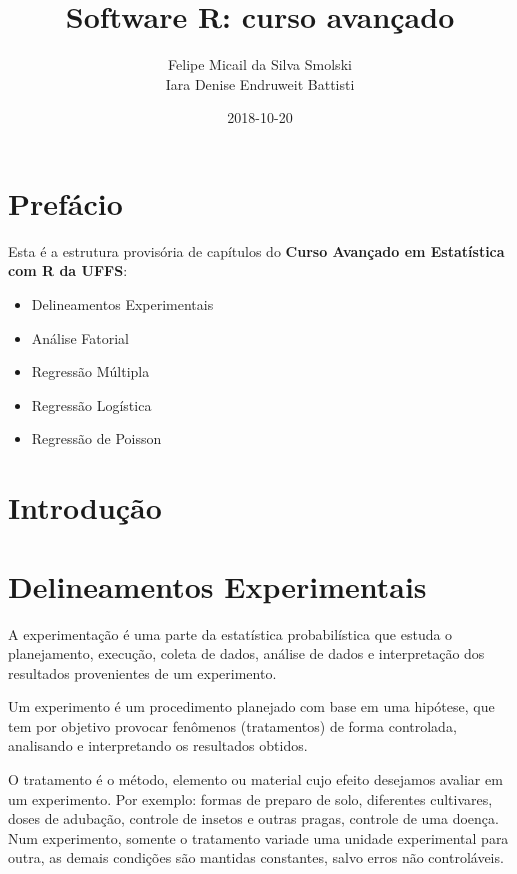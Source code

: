 \documentclass[12pt,brazil,oneside]{book}
\title{Software R: curso avançado}
\author{Felipe Micail da Silva Smolski \\ Iara Denise Endruweit Battisti}
\date{2018-10-20}
\providecommand{\tightlist}{%
  \setlength{\itemsep}{0pt}\setlength{\parskip}{0pt}}
\begin{document}
\maketitle

{
\setcounter{tocdepth}{1}
\tableofcontents
}
\hypertarget{prefacio}{%
\chapter*{Prefácio}\label{prefacio}}

Esta é a estrutura provisória de capítulos do \textbf{Curso Avançado em
Estatística com R da UFFS}:

\begin{itemize}
\tightlist
\item
  Delineamentos Experimentais
\item
  Análise Fatorial
\item
  Regressão Múltipla
\item
  Regressão Logística
\item
  Regressão de Poisson
\end{itemize}

\hypertarget{introducao}{%
\chapter*{Introdução}\label{introducao}}

\hypertarget{delineamentos-experimentais}{%
\chapter{Delineamentos
Experimentais}\label{delineamentos-experimentais}}

A experimentação é uma parte da estatística probabilística que estuda o
planejamento, execução, coleta de dados, análise de dados e
interpretação dos resultados provenientes de um experimento.

Um experimento é um procedimento planejado com base em uma hipótese, que
tem por objetivo provocar fenômenos (tratamentos) de forma controlada,
analisando e interpretando os resultados obtidos.

O tratamento é o método, elemento ou material cujo efeito desejamos
avaliar em um experimento. Por exemplo: formas de preparo de solo,
diferentes cultivares, doses de adubação, controle de insetos e outras
pragas, controle de uma doença. Num experimento, somente o tratamento
variade uma unidade experimental para outra, as demais condições são
mantidas constantes, salvo erros não controláveis.
\end{document}
